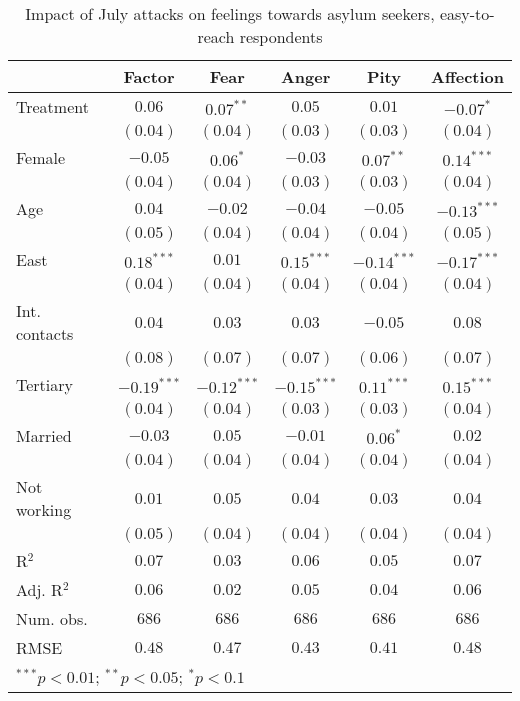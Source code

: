 
\begin{table}
\caption{Impact of July attacks on feelings towards asylum seekers, easy-to-reach respondents}
\begin{center}
\begin{tabular}{l c c c c c}
\toprule
 & Factor & Fear & Anger & Pity & Affection \\
\midrule
Treatment     & $0.06$        & $0.07^{**}$   & $0.05$        & $0.01$        & $-0.07^{*}$   \\
              & $(0.04)$      & $(0.04)$      & $(0.03)$      & $(0.03)$      & $(0.04)$      \\
Female        & $-0.05$       & $0.06^{*}$    & $-0.03$       & $0.07^{**}$   & $0.14^{***}$  \\
              & $(0.04)$      & $(0.04)$      & $(0.03)$      & $(0.03)$      & $(0.04)$      \\
Age           & $0.04$        & $-0.02$       & $-0.04$       & $-0.05$       & $-0.13^{***}$ \\
              & $(0.05)$      & $(0.04)$      & $(0.04)$      & $(0.04)$      & $(0.05)$      \\
East          & $0.18^{***}$  & $0.01$        & $0.15^{***}$  & $-0.14^{***}$ & $-0.17^{***}$ \\
              & $(0.04)$      & $(0.04)$      & $(0.04)$      & $(0.04)$      & $(0.04)$      \\
Int. contacts & $0.04$        & $0.03$        & $0.03$        & $-0.05$       & $0.08$        \\
              & $(0.08)$      & $(0.07)$      & $(0.07)$      & $(0.06)$      & $(0.07)$      \\
Tertiary      & $-0.19^{***}$ & $-0.12^{***}$ & $-0.15^{***}$ & $0.11^{***}$  & $0.15^{***}$  \\
              & $(0.04)$      & $(0.04)$      & $(0.03)$      & $(0.03)$      & $(0.04)$      \\
Married       & $-0.03$       & $0.05$        & $-0.01$       & $0.06^{*}$    & $0.02$        \\
              & $(0.04)$      & $(0.04)$      & $(0.04)$      & $(0.04)$      & $(0.04)$      \\
Not working   & $0.01$        & $0.05$        & $0.04$        & $0.03$        & $0.04$        \\
              & $(0.05)$      & $(0.04)$      & $(0.04)$      & $(0.04)$      & $(0.04)$      \\
\midrule
R$^2$         & $0.07$        & $0.03$        & $0.06$        & $0.05$        & $0.07$        \\
Adj. R$^2$    & $0.06$        & $0.02$        & $0.05$        & $0.04$        & $0.06$        \\
Num. obs.     & $686$         & $686$         & $686$         & $686$         & $686$         \\
RMSE          & $0.48$        & $0.47$        & $0.43$        & $0.41$        & $0.48$        \\
\bottomrule
\multicolumn{6}{l}{\scriptsize{$^{***}p<0.01$; $^{**}p<0.05$; $^{*}p<0.1$}}
\end{tabular}
\label{tab_emo_reach}
\end{center}
\end{table}
